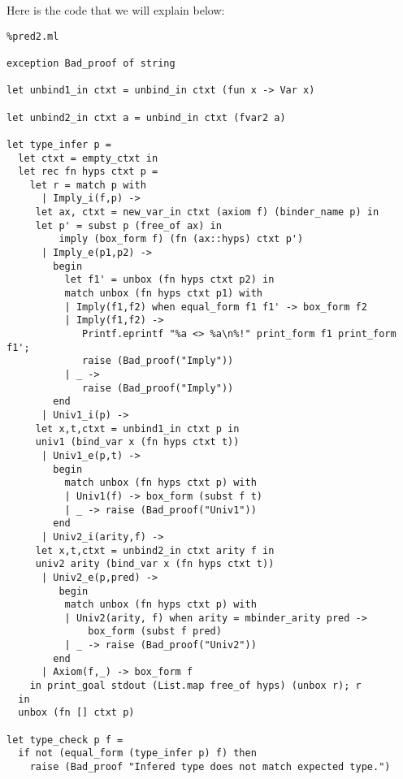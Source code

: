 \documentclass[11pt]{article}
\begin{document}
Here is the code that we will explain below:
\begin{lstlisting}%pred2.ml

exception Bad_proof of string

let unbind1_in ctxt = unbind_in ctxt (fun x -> Var x)

let unbind2_in ctxt a = unbind_in ctxt (fvar2 a)

let type_infer p =
  let ctxt = empty_ctxt in
  let rec fn hyps ctxt p =
    let r = match p with
      | Imply_i(f,p) ->
	 let ax, ctxt = new_var_in ctxt (axiom f) (binder_name p) in
	 let p' = subst p (free_of ax) in
         imply (box_form f) (fn (ax::hyps) ctxt p')
      | Imply_e(p1,p2) ->
        begin
          let f1' = unbox (fn hyps ctxt p2) in
          match unbox (fn hyps ctxt p1) with
          | Imply(f1,f2) when equal_form f1 f1' -> box_form f2
          | Imply(f1,f2) ->
             Printf.eprintf "%a <> %a\n%!" print_form f1 print_form f1';
             raise (Bad_proof("Imply"))
          | _ ->
             raise (Bad_proof("Imply"))
        end
      | Univ1_i(p) ->
	 let x,t,ctxt = unbind1_in ctxt p in
	 univ1 (bind_var x (fn hyps ctxt t))
      | Univ1_e(p,t) ->
        begin
          match unbox (fn hyps ctxt p) with
          | Univ1(f) -> box_form (subst f t)
          | _ -> raise (Bad_proof("Univ1"))
        end
      | Univ2_i(arity,f) ->
	 let x,t,ctxt = unbind2_in ctxt arity f in
	 univ2 arity (bind_var x (fn hyps ctxt t))
      | Univ2_e(p,pred) ->
         begin
          match unbox (fn hyps ctxt p) with
          | Univ2(arity, f) when arity = mbinder_arity pred ->
              box_form (subst f pred)
          | _ -> raise (Bad_proof("Univ2"))
        end
      | Axiom(f,_) -> box_form f
    in print_goal stdout (List.map free_of hyps) (unbox r); r
  in
  unbox (fn [] ctxt p)

let type_check p f =
  if not (equal_form (type_infer p) f) then
    raise (Bad_proof "Infered type does not match expected type.")
\end{lstlisting}
\end{document}
